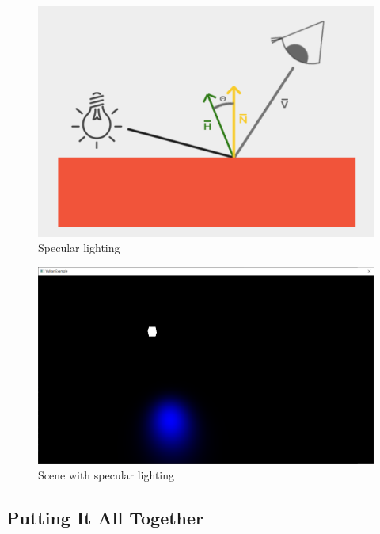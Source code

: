 \begin{figure}[H]
    \centering
    \includegraphics[scale=0.40]{images/ChBlinnPhong/SpecularLighting.png}
    \caption{Specular lighting}
    \label{fig::SpecularLighting}
\end{figure}

\begin{minipage}{\linewidth}{\noindent}
    
\end{minipage}

\begin{figure}[H]
    \centering
    \includegraphics[scale=0.25]{images/ChBlinnPhong/SceneSpecular.png}
    \caption{Scene with specular lighting}
    \label{fig::SceneSpecular}
\end{figure}

\subsection{Putting It All Together}

